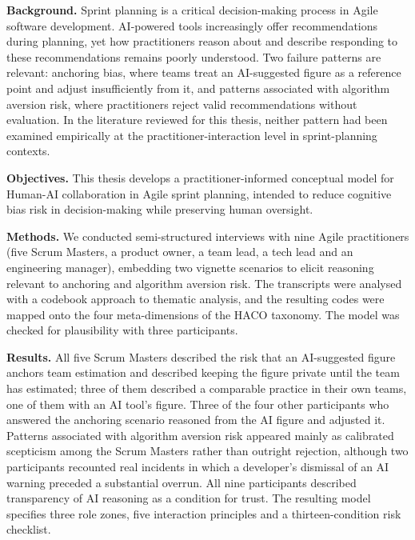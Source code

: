 \documentclass[a4paper,twoside]{bth}
\begin{document}
\setcounter{page}{1}

\abstract
\noindent
\textbf{Background.}
Sprint planning is a critical decision-making process in Agile software development. AI-powered tools increasingly offer recommendations during planning, yet how practitioners reason about and describe responding to these recommendations remains poorly understood. Two failure patterns are relevant: anchoring bias, where teams treat an AI-suggested figure as a reference point and adjust insufficiently from it, and patterns associated with algorithm aversion risk, where practitioners reject valid recommendations without evaluation. In the literature reviewed for this thesis, neither pattern had been examined empirically at the practitioner-interaction level in sprint-planning contexts.

\noindent
\textbf{Objectives.}
This thesis develops a practitioner-informed conceptual model for Human-AI collaboration in Agile sprint planning, intended to reduce cognitive bias risk in decision-making while preserving human oversight.

\noindent
\textbf{Methods.}
We conducted semi-structured interviews with nine Agile practitioners (five Scrum Masters, a product owner, a team lead, a tech lead and an engineering manager), embedding two vignette scenarios to elicit reasoning relevant to anchoring and algorithm aversion risk. The transcripts were analysed with a codebook approach to thematic analysis, and the resulting codes were mapped onto the four meta-dimensions of the HACO taxonomy. The model was checked for plausibility with three participants.

\noindent
\textbf{Results.}
All five Scrum Masters described the risk that an AI-suggested figure anchors team estimation and described keeping the figure private until the team has estimated; three of them described a comparable practice in their own teams, one of them with an AI tool's figure. Three of the four other participants who answered the anchoring scenario reasoned from the AI figure and adjusted it. Patterns associated with algorithm aversion risk appeared mainly as calibrated scepticism among the Scrum Masters rather than outright rejection, although two participants recounted real incidents in which a developer's dismissal of an AI warning preceded a substantial overrun. All nine participants described transparency of AI reasoning as a condition for trust. The resulting model specifies three role zones, five interaction principles and a thirteen-condition risk checklist.
\end{document}
